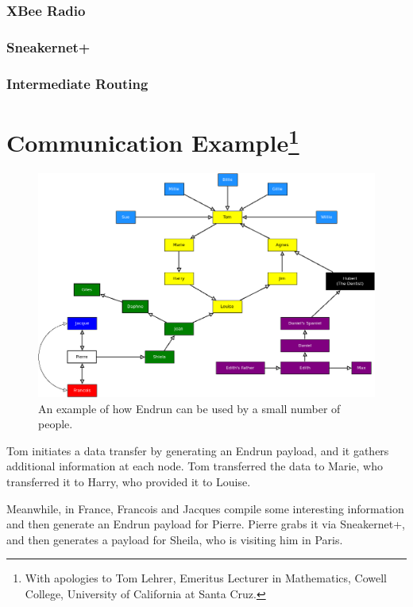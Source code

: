 \documentclass[12pt]{article}
\begin{document}
  \subsubsection{XBee Radio}
  \subsubsection{Sneakernet+}
  \subsubsection{Intermediate Routing}
  \label{subsec:introuting}
  
  \section{Communication Example\footnote{With apologies to Tom Lehrer, Emeritus Lecturer in Mathematics, Cowell College, University of California at Santa Cruz.}}
  
      \begin{figure}[h]
      \centering{}
      \includegraphics[scale=0.45]{Diagram3.png}
      \caption{ An example of how Endrun can be used by a small number of people.}
    \end{figure}
  
  Tom initiates a data transfer by generating an Endrun payload, and it gathers additional information at each node. Tom transferred the data to Marie, who transferred it to Harry, who provided it to Louise.
  
  Meanwhile, in France, Francois and Jacques compile some interesting information and then generate an Endrun payload for Pierre. Pierre grabs it via Sneakernet+, and then generates a payload for Sheila, who is visiting him in Paris.
  
\end{document}
